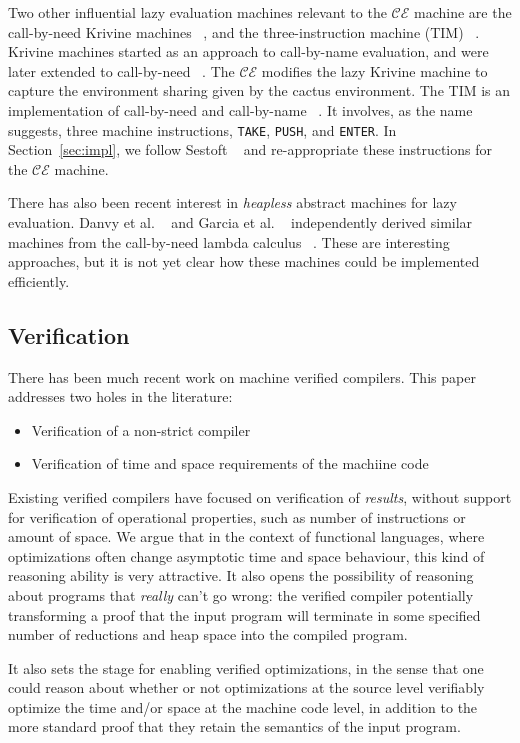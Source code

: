 Two other influential lazy evaluation machines relevant to the $\mathcal{CE}$
machine are the call-by-need Krivine machines
~\cite{lkm,krivine2007call,sestoft}, and the three-instruction machine (TIM)
~\cite{TIM}.  Krivine machines started as an approach to call-by-name
evaluation, and were later extended to call-by-need
~\cite{krivine2007call,sestoft,danvy2013synthetic,lkm}.  The $\mathcal{CE}$
modifies the lazy Krivine machine to capture the environment sharing given by
the cactus environment. The TIM is an implementation of call-by-need and
call-by-name ~\cite{TIM}.  It involves, as the name suggests, three machine
instructions, \texttt{TAKE}, \texttt{PUSH}, and \texttt{ENTER}. In
Section~\ref{sec:impl}, we follow Sestoft ~\cite{sestoft} and
re-appropriate these instructions for the $\mathcal{CE}$ machine.

There has also been recent interest in \emph{heapless} abstract
machines for lazy evaluation. Danvy et al. ~\cite{danvy2012inter} and
Garcia et al. ~\cite{garcia2009lazy} independently derived similar
machines from the call-by-need lambda calculus
~\cite{ariola1995call}. These are interesting approaches, but it is not yet
clear how these machines could be implemented efficiently.

\subsection{Verification}
There has been much recent work on machine verified compilers. This paper
addresses two holes in the literature: 
\begin{itemize}
\item Verification of a non-strict compiler
\item Verification of time and space requirements of the machiine code 
\end{itemize}
Existing verified compilers have focused on verification of \emph{results},
without support for verification of operational properties, such as number of
instructions or amount of space. We argue that in the context of functional
languages, where optimizations often change asymptotic time and space behaviour,
this kind of reasoning ability is very attractive. It also opens the possibility
of reasoning about programs that \emph{really} can't go wrong: the verified
compiler potentially transforming a proof that the input program will terminate
in some specified number of reductions and heap space into the compiled program.

It also sets the stage for enabling verified optimizations, in the sense that
one could reason about whether or not optimizations at the source level
verifiably optimize the time and/or space at the machine code level, in addition
to the more standard proof that they retain the semantics of the input program. 

